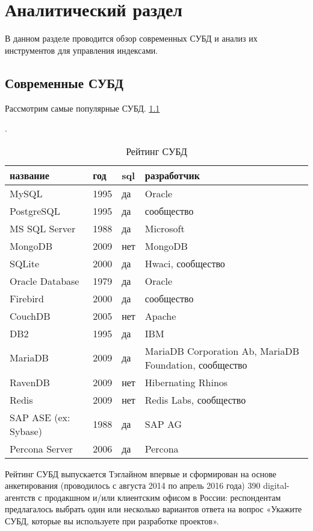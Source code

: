 \chapter{Аналитический раздел}

В данном разделе проводится обзор современных СУБД и анализ их инструментов для управления индексами.

\section{Современные СУБД}

Рассмотрим самые популярные СУБД. \ref{table:list_dbms}

\begin{table}[h]
\caption{Рейтинг СУБД}\label{table:list_dbms}.
\medskip
\begin{tabular}{|l|l|l|p{9cm}|}
\hline
название & год & sql & разработчик\\
\hline
MySQL & 1995 & да & Oracle\\
PostgreSQL & 1995 & да & сообщество\\
MS SQL Server & 1988 & да & Microsoft\\
MongoDB & 2009 & нет & MongoDB\\
SQLite & 2000 & да & Hwaci, сообщество\\
Oracle Database & 1979 & да & Oracle\\
Firebird & 2000 & да & сообщество\\
CouchDB & 2005 & нет & Apache\\
DB2 & 1995 & да & IBM\\
MariaDB & 2009 & да & MariaDB Corporation Ab, MariaDB Foundation, сообщество\\
RavenDB & 2009 & нет & Hibernating Rhinos\\
Redis & 2009 & нет & Redis Labs, сообщество\\
SAP ASE (ex: Sybase) & 1988 & да & SAP AG\\
Percona Server & 2006 & да & Percona\\
\hline
\end{tabular}
\end{table}

Рейтинг СУБД выпускается Тэглайном впервые и сформирован на основе анкетирования (проводилось с августа 2014 по апрель 2016 года) 390 digital-агентств с продакшном и/или клиентским офисом в России: респондентам предлагалось выбрать один или несколько вариантов ответа на вопрос «Укажите СУБД, которые вы используете при разработке проектов». \cite{tagline.ru:List_DBMS}

